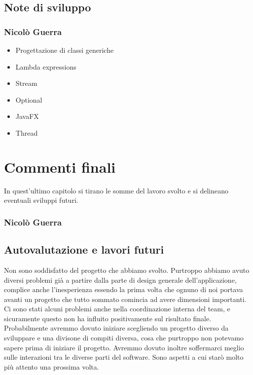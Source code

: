 \documentclass[a4paper,12pt]{report}
\begin{document}
\section{Note di sviluppo}

\subsection{Nicolò Guerra}
\begin{itemize}
	\item Progettazione di classi generiche
	\item Lambda expressions
	\item Stream
	\item Optional
	\item JavaFX
	\item Thread
\end{itemize}

\chapter{Commenti finali}

In quest'ultimo capitolo si tirano le somme del lavoro svolto e si delineano eventuali sviluppi
futuri.

\subsection{Nicolò Guerra}

\section{Autovalutazione e lavori futuri}

Non sono soddisfatto del progetto che abbiamo svolto. Purtroppo abbiamo avuto diversi problemi già a partire dalla parte di design generale dell'applicazione, complice anche l'inesperienza essendo la prima
volta che ognuno di noi portava avanti un progetto che tutto sommato comincia ad avere dimensioni importanti. Ci sono stati alcuni problemi anche nella coordinazione interna del team, e sicuramente questo
non ha influito positivamente sul risultato finale. Probabilmente avremmo dovuto iniziare scegliendo un progetto diverso da sviluppare e una divisone di compiti diversa, cosa che purtroppo non potevamo sapere
prima di iniziare il progetto. Avremmo dovuto inoltre soffermarci meglio sulle interazioni tra le diverse parti del software. Sono aspetti a cui starò molto più attento una prossima volta.
\end{document}
